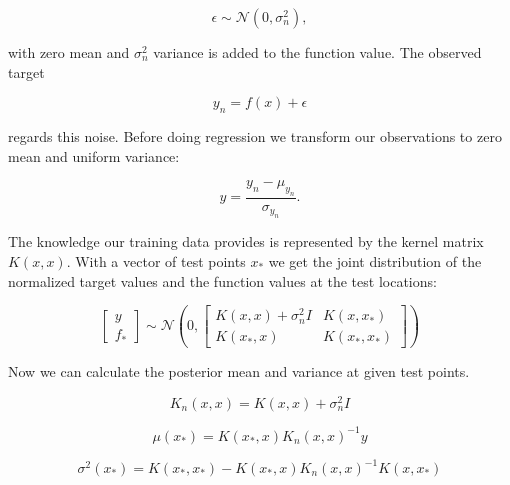 $$\epsilon \sim \mathcal{N}(0,\sigma_n^2),$$

with zero mean and $\sigma_n^2$ variance is added to the function value. The observed target

$$y_{n} = f(x) + \epsilon$$

regards this noise. Before doing regression we transform our observations to zero mean and uniform variance:

$$y = \frac{y_{n}-\mu_{y_{n}}}{\sigma_{y_{n}}}.$$

The knowledge our training data provides is represented by the kernel matrix $K(x,x)$. With a vector of test points $x_*$ we get the joint distribution of the normalized target values and the function values at the test locations:

$$\left[ \begin{array}{c} y \\ f_* \end{array} \right] \sim \mathcal{N} \left(0, \begin{bmatrix} K(x,x)+\sigma_n^2 I & K(x,x_*) \\ K(x_*,x) & K(x_*,x_*) \end{bmatrix} \right)$$

Now we can calculate the posterior mean and variance at given test points.

\begin{equation} \label{eq:kNoise}
    K_n(x,x) = K(x,x)+\sigma_n^2 I
\end{equation}

\begin{equation} \label{eq:meanGauss}
    \mu(x_*)= K(x_*,x)K_n(x,x)^{-1}y
\end{equation}

$$\sigma^2(x_*)= K(x_*,x_*)-K(x_*,x)K_n(x,x)^{-1}K(x,x_*)$$

